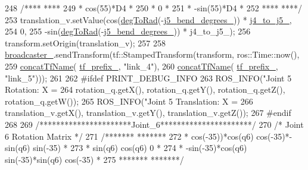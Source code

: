 \begin{DoxyCode}
{{{{{{{{{{{{248     \textcolor{comment}{/****        ****}
249 \textcolor{comment}{     * cos(55)*D4   *}
250 \textcolor{comment}{     *       0      *}
251 \textcolor{comment}{     * -sin(55)*D4  *}
252 \textcolor{comment}{     ****       ****/}
253     translation\_v.setValue(cos(\hyperlink{classjaco_1_1JacoKinematics_a340eda126d97aa3700cc5dc8be89aa39}{degToRad}(-\hyperlink{classjaco_1_1JacoKinematics_ad309e89a6e5c60e0f614629c5f1b4c79}{j5\_bend\_degrees\_})) * 
      \hyperlink{classjaco_1_1JacoKinematics_a5e322eafc0b3b827ae1713d24178c1f8}{j4\_to\_j5\_},
254                            0,
255                            -sin(\hyperlink{classjaco_1_1JacoKinematics_a340eda126d97aa3700cc5dc8be89aa39}{degToRad}(-\hyperlink{classjaco_1_1JacoKinematics_ad309e89a6e5c60e0f614629c5f1b4c79}{j5\_bend\_degrees\_})) * j4\_to\_j5\_);
256     transform.setOrigin(translation\_v);
257 
258     \hyperlink{classjaco_1_1JacoKinematics_a3314f9e6a8fb86405384dd23bd194e46}{broadcaster\_}.sendTransform(tf::StampedTransform(transform, ros::Time::now(),
259                                                     \hyperlink{namespacejaco_a6320c11725be13d2957c4e3f474d62f8}{concatTfName}(
      \hyperlink{classjaco_1_1JacoKinematics_a0efb1f0ad1937553c7e285b27da0bdd3}{tf\_prefix\_}, \textcolor{stringliteral}{"link\_4"}),
260                                                     \hyperlink{namespacejaco_a6320c11725be13d2957c4e3f474d62f8}{concatTfName}(
      \hyperlink{classjaco_1_1JacoKinematics_a0efb1f0ad1937553c7e285b27da0bdd3}{tf\_prefix\_}, \textcolor{stringliteral}{"link\_5"})));
261 
262 \textcolor{preprocessor}{#ifdef PRINT\_DEBUG\_INFO}
263     ROS\_INFO(\textcolor{stringliteral}{"Joint 5 Rotation: X = %
264              rotation\_q.getX(), rotation\_q.getY(), rotation\_q.getZ(), rotation\_q.getW());
265     ROS\_INFO(\textcolor{stringliteral}{"Joint 5 Translation: X = %
266              translation\_v.getX(), translation\_v.getY(), translation\_v.getZ());
267 \textcolor{preprocessor}{#endif}
268 
269     \textcolor{comment}{/**********************Joint\_6**********************/}
270     \textcolor{comment}{/* Joint 6 Rotation Matrix */}
271     \textcolor{comment}{/*******                                       *******}
272 \textcolor{comment}{     * cos(-35))*cos(q6)   cos(-35)*-sin(q6)    sin(-35) *}
273 \textcolor{comment}{     *     sin(q6)              cos(q6)            0     *}
274 \textcolor{comment}{     * -sin(-35)*cos(q6)   sin(-35)*sin(q6)     cos(-35) *}
275 \textcolor{comment}{     *******                                       *******/}
}}}}}}}}}}}}}}
\end{DoxyCode}
